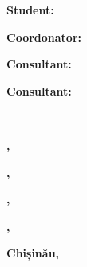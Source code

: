 \begin{titlepage}
\begin{titlepagefont}
    	\hfill
        \begin{minipage}{0.25\textwidth}
            \raggedright
            {\bfseries Student: \par}
            {\bfseries Coordonator: \par}
            {\bfseries Consultant: \par}
            {\bfseries Consultant: \par}
	    \end{minipage}
	    ~
	    \begin{minipage}{0.45\textwidth}
	        \raggedleft
	        {\bfseries \studentname, \studentgroup \par}
	        {\bfseries  \par}
	        {\bfseries \teachername, \teachertitle \par}
	        {\bfseries \consultantonename, \consultantonetitle \par}
	        {\bfseries \consultanttwoname, \consultanttwotitle \par}
	    \end{minipage}
    	
    	\vfill

    	{\bfseries Chișinău, \thesisyear \par}
	
	\end{titlepagefont}
\end{titlepage}
